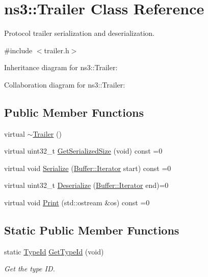 \hypertarget{classns3_1_1Trailer}{}\section{ns3\+:\+:Trailer Class Reference}
\label{classns3_1_1Trailer}


Protocol trailer serialization and deserialization.  




{\ttfamily \#include $<$trailer.\+h$>$}



Inheritance diagram for ns3\+:\+:Trailer\+:


Collaboration diagram for ns3\+:\+:Trailer\+:
\subsection*{Public Member Functions}
\begin{DoxyCompactItemize}
\item 
virtual \hyperlink{classns3_1_1Trailer_a3e5cd4870fce09ff5f3ea30d243dbd2f}{$\sim$\+Trailer} ()
\item 
virtual uint32\+\_\+t \hyperlink{classns3_1_1Trailer_a6af7be196bad576c3601e267b0637ff7}{Get\+Serialized\+Size} (void) const =0
\item 
virtual void \hyperlink{classns3_1_1Trailer_a160451b2ded3a615b1ccfa25ab60c2e3}{Serialize} (\hyperlink{classns3_1_1Buffer_1_1Iterator}{Buffer\+::\+Iterator} start) const =0
\item 
virtual uint32\+\_\+t \hyperlink{classns3_1_1Trailer_aed0f0292faca43ef8676c05d70a664cf}{Deserialize} (\hyperlink{classns3_1_1Buffer_1_1Iterator}{Buffer\+::\+Iterator} end)=0
\item 
virtual void \hyperlink{classns3_1_1Trailer_ab581a4290e87f7420e012c78fcb0a34a}{Print} (std\+::ostream \&os) const =0
\end{DoxyCompactItemize}
\subsection*{Static Public Member Functions}
\begin{DoxyCompactItemize}
\item 
static \hyperlink{classns3_1_1TypeId}{Type\+Id} \hyperlink{classns3_1_1Trailer_a93dd50665201460721fa5722d583f34f}{Get\+Type\+Id} (void)
\begin{DoxyCompactList}\small\item\em Get the type ID. \end{DoxyCompactList}\end{DoxyCompactItemize}
